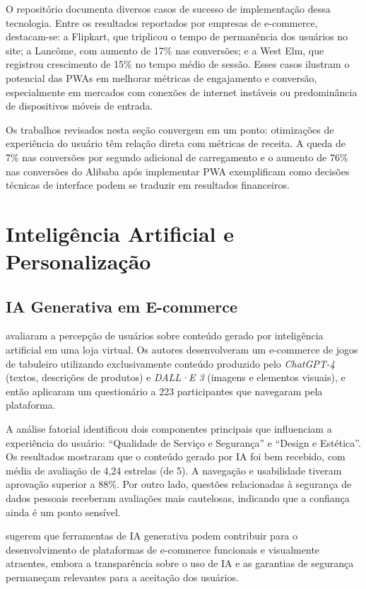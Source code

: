 O repositório \cite{pwa_stats_2024} documenta diversos casos de sucesso de implementação dessa tecnologia. Entre os resultados reportados por empresas de e-commerce, destacam-se: a Flipkart, que triplicou o tempo de permanência dos usuários no site; a Lancôme, com aumento de 17\% nas conversões; e a West Elm, que registrou crescimento de 15\% no tempo médio de sessão. Esses casos ilustram o potencial das PWAs em melhorar métricas de engajamento e conversão, especialmente em mercados com conexões de internet instáveis ou predominância de dispositivos móveis de entrada.

Os trabalhos revisados nesta seção convergem em um ponto: otimizações de experiência do usuário têm relação direta com métricas de receita. A queda de 7\% nas conversões por segundo adicional de carregamento \cite{bansal_seo_2024} e o aumento de 76\% nas conversões do Alibaba após implementar PWA \cite{google_alibaba_2016} exemplificam como decisões técnicas de interface podem se traduzir em resultados financeiros.

\section{Inteligência Artificial e Personalização}

\subsection{IA Generativa em E-commerce}

\cite{stamkou_user_2025} avaliaram a percepção de usuários sobre conteúdo gerado por inteligência artificial em uma loja virtual. Os autores desenvolveram um e-commerce de jogos de tabuleiro utilizando exclusivamente conteúdo produzido pelo \textit{ChatGPT-4} (textos, descrições de produtos) e \textit{DALL·E 3} (imagens e elementos visuais), e então aplicaram um questionário a 223 participantes que navegaram pela plataforma.

A análise fatorial identificou dois componentes principais que influenciam a experiência do usuário: ``Qualidade de Serviço e Segurança'' e ``Design e Estética''. Os resultados mostraram que o conteúdo gerado por IA foi bem recebido, com média de avaliação de 4,24 estrelas (de 5). A navegação e usabilidade tiveram aprovação superior a 88\%. Por outro lado, questões relacionadas à segurança de dados pessoais receberam avaliações mais cautelosas, indicando que a confiança ainda é um ponto sensível.

\cite{stamkou_user_2025} sugerem que ferramentas de IA generativa podem contribuir para o desenvolvimento de plataformas de e-commerce funcionais e visualmente atraentes, embora a transparência sobre o uso de IA e as garantias de segurança permaneçam relevantes para a aceitação dos usuários.

